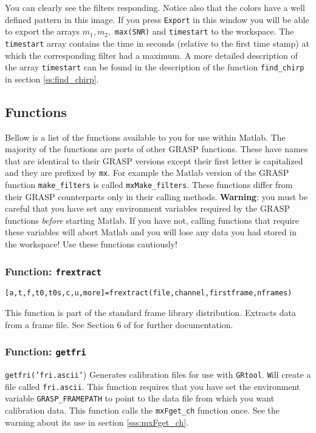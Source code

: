 You can clearly see the filters responding. Notice also that the colors have a
well defined pattern in this image. If you press \texttt{Export} in this
window you will be able to export the arrays $m_{1},m_{2},$ \texttt{max(SNR)}
and \texttt{timestart} to the workspace. The \texttt{timestart} array contains
the time in seconds (relative to the first time stamp) at which the
corresponding filter had a maximum. A more detailed description of the array
\texttt{timestart} can be found in the description of the function
\texttt{find\_chirp} in section \ref{ss:find_chirp}.

\subsection{Functions}
\label{ss:GRtoolboxFunctions}

Bellow is a list of the functions available to you for use within Matlab. The
majority of the functions are ports of other GRASP functions. These have names that
are identical to their GRASP versions except their first letter is capitalized
and they are prefixed by \texttt{mx}. For example the Matlab version of the
GRASP function \texttt{make\_filters} is called \texttt{mxMake\_filters}.
These functions differ from their GRASP counterparts only
in their calling methods. \textbf{Warning}: you must be careful that you have
set any environment variables required by the GRASP functions \emph{before}
starting Matlab. If you have not, calling functions that require these
variables will abort Matlab and you will lose any data you had stored in the
workspace! Use these functions cautiously!

\subsubsection{Function: {\tt frextract}}
\label{sss:frextract}

\texttt{[a,t,f,t0,t0s,c,u,more]=frextract(file,channel,firstframe,nframes)}

This function is part of the standard frame library distribution.
Extracts data from a frame file. See Section 6 of \cite{frame}
for further documentation.

\subsubsection{Function: {\tt getfri}}
\label{sss:getfri}

\texttt{getfri('fri.ascii'}) Generates calibration files for use with
\texttt{GRtool}. \texttt{W}ill create a file called \texttt{fri.ascii}. This
function requires that you have set the environment variable
\texttt{GRASP\_FRAMEPATH} to point to the data file from which you want
calibration data. This function calls the \texttt{mxFget\_ch} function once.
See the warning about its use in section \ref{sss:mxFget_ch}.

